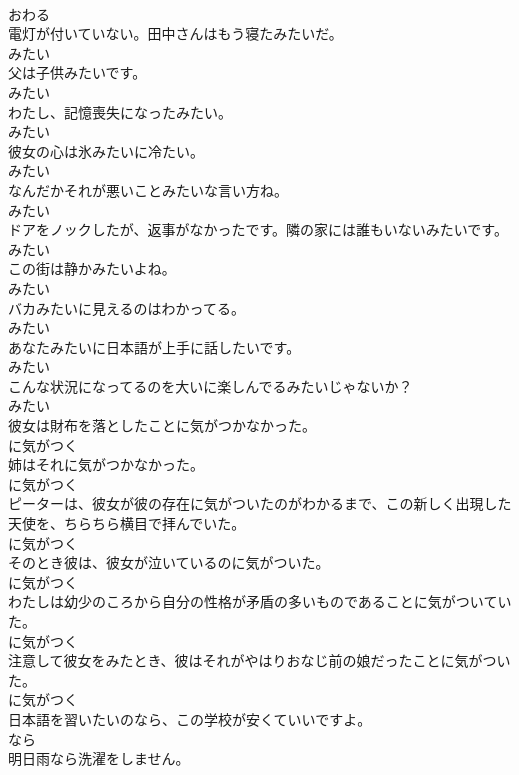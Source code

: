 \documentclass[8pt]{extreport}
\begin{document}
\begin{CJK}{UTF8}{min}
\\	おわる	
\\	電灯が付いていない。田中さんはもう寝たみたいだ。	
\\	みたい	
\\	父は子供みたいです。	
\\	みたい	
\\	わたし、記憶喪失になったみたい。	
\\	みたい	
\\	彼女の心は氷みたいに冷たい。	
\\	みたい	
\\	なんだかそれが悪いことみたいな言い方ね。	
\\	みたい	
\\	ドアをノックしたが、返事がなかったです。隣の家には誰もいないみたいです。	
\\	みたい	
\\	この街は静かみたいよね。	
\\	みたい	
\\	バカみたいに見えるのはわかってる。	
\\	みたい	
\\	あなたみたいに日本語が上手に話したいです。	
\\	みたい	
\\	こんな状況になってるのを大いに楽しんでるみたいじゃないか？	
\\	みたい	
\\	彼女は財布を落としたことに気がつかなかった。	
\\	に気がつく	
\\	姉はそれに気がつかなかった。	
\\	に気がつく	
\\	ピーターは、彼女が彼の存在に気がついたのがわかるまで、この新しく出現した天使を、ちらちら横目で拝んでいた。	
\\	に気がつく	
\\	そのとき彼は、彼女が泣いているのに気がついた。	
\\	に気がつく	
\\	わたしは幼少のころから自分の性格が矛盾の多いものであることに気がついていた。	
\\	に気がつく	
\\	注意して彼女をみたとき、彼はそれがやはりおなじ前の娘だったことに気がついた。	
\\	に気がつく	
\\	日本語を習いたいのなら、この学校が安くていいですよ。	
\\	なら	
\\	明日雨なら洗濯をしません。	

\end{CJK}
\end{document}
